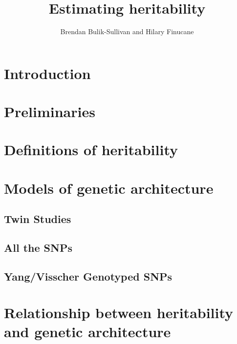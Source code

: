 \documentclass[11pt]{article}
\title{Estimating heritability}
\author{Brendan Bulik-Sullivan and Hilary Finucane}
\date{}
\newcommand{\eps}{\epsilon}
\begin{document}
\maketitle

\begin{abstract}

\end{abstract}

\section{Introduction}


\section{Preliminaries}
\label{preliminaries}

\section{Definitions of heritability}

\section{Models of genetic architecture}

\subsection{Twin Studies}

\subsection{All the SNPs}

\subsection{Yang/Visscher Genotyped SNPs}

\section{Relationship between heritability and genetic architecture}
\end{document}
